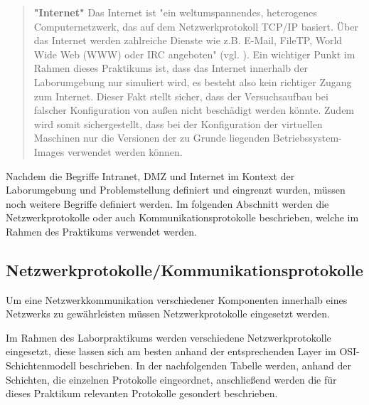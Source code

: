 \documentclass[
a4paper,     %
 headsepline, %
footsepline, %
titlepage,   %
 halfparskip,     %
 fleqn,       %
12pt         %
]{scrartcl}  %
\begin{document}
\begin{quotation}
\item[\textbf{"Internet"}]
Das Internet ist "ein weltumspannendes, heterogenes Computernetzwerk, das auf dem Netzwerkprotokoll TCP/IP basiert. Über das Internet werden zahlreiche Dienste wie z.B. E-Mail, FileTP, World Wide Web (WWW) oder IRC angeboten" (vgl. \cite{Gab-Internet}). Ein wichtiger Punkt im Rahmen dieses Praktikums ist, dass das Internet innerhalb der Laborumgebung nur simuliert wird, es besteht also kein richtiger Zugang zum Internet. Dieser Fakt stellt sicher, dass der Versuchsaufbau bei falscher Konfiguration von außen nicht beschädigt werden könnte. Zudem wird somit sichergestellt, dass bei der Konfiguration der virtuellen Maschinen nur die Versionen der zu Grunde liegenden Betriebssystem-Images verwendet werden können. 

\end{quotation}

Nachdem die Begriffe Intranet, DMZ und Internet im Kontext der Laborumgebung und Problemstellung definiert und eingrenzt wurden, müssen noch weitere Begriffe definiert werden. Im folgenden Abschnitt werden die Netzwerkprotokolle oder auch Kommunikationsprotokolle beschrieben, welche im Rahmen des Praktikums verwendet werden. 

\subsection{Netzwerkprotokolle/Kommunikationsprotokolle} 
Um eine Netzwerkkommunikation verschiedener Komponenten innerhalb eines Netzwerks zu gewährleisten müssen Netzwerkprotokolle eingesetzt werden. 

Im Rahmen des Laborpraktikums werden verschiedene Netzwerkprotokolle eingesetzt, diese lassen sich am besten anhand der entsprechenden Layer im OSI-Schichtenmodell beschrieben. 
In der nachfolgenden Tabelle werden, anhand der Schichten, die einzelnen Protokolle eingeordnet, anschließend werden die für dieses Praktikum relevanten Protokolle gesondert beschrieben. 
\end{document}
